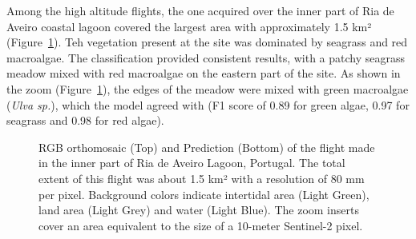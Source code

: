 \documentclass[
  number]{elsarticle}
\begin{document}
Among the high altitude flights, the one acquired over the inner part of
Ria de Aveiro coastal lagoon covered the largest area with approximately
1.5 km² (Figure~\ref{fig-Boat}). Teh vegetation present at the site was
dominated by seagrass and red macroalgae. The classification provided
consistent results, with a patchy seagrass meadow mixed with red
macroalgae on the eastern part of the site. As shown in the zoom
(Figure~\ref{fig-Boat}), the edges of the meadow were mixed with green
macroalgae (\emph{Ulva sp.}), which the model agreed with (F1 score of
0.89 for green algae, 0.97 for seagrass and 0.98 for red algae).

\label{cell-fig-Boat}
\begin{figure}[H]


\caption{\label{fig-Boat}RGB orthomosaic (Top) and Prediction (Bottom)
of the flight made in the inner part of Ria de Aveiro Lagoon, Portugal.
The total extent of this flight was about 1.5 km² with a resolution of
80 mm per pixel. Background colors indicate intertidal area (Light
Green), land area (Light Grey) and water (Light Blue). The zoom inserts
cover an area equivalent to the size of a 10-meter Sentinel-2 pixel.}

\end{figure}%
\end{document}
